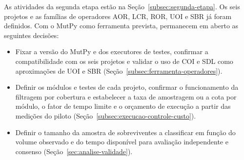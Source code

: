 As atividades da segunda etapa estão na Seção~\ref{subsec:segunda-etapa}. Os seis projetos e as famílias de operadores AOR, LCR, ROR, UOI e SBR já foram definidos. Com o MutPy como ferramenta prevista, permanecem em aberto as seguintes decisões:

\begin{itemize}
    \item Fixar a versão do MutPy e dos executores de testes, confirmar a compatibilidade com os seis projetos e validar o uso de COI e SDL como aproximações de UOI e SBR (Seção~\ref{subsec:ferramenta-operadores}).
    \item Definir os módulos e testes de cada projeto, confirmar o funcionamento da filtragem por cobertura e estabelecer a taxa de amostragem ou a cota por módulo, o fator de tempo limite e o orçamento de execução a partir das medições do piloto (Seção~\ref{subsec:execucao-controle-custo}).
    \item Definir o tamanho da amostra de sobreviventes a classificar em função do volume observado e do tempo disponível para avaliação independente e consenso (Seção~\ref{sec:analise-validade}).
\end{itemize}